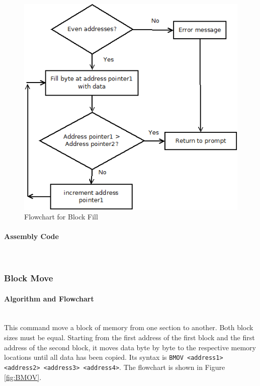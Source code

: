 \documentclass[12pt]{article}
\begin{document}
			
\begin{figure}[H]
\centering
\includegraphics[width=0.7\linewidth]{BF}
\caption{Flowchart for Block Fill}
\label{fig:BF}
\end{figure}
			\paragraph{Assembly Code}~\\
			
			
			\subsubsection{Block Move}
			
			
			
			\paragraph{Algorithm and Flowchart}~\\
			This command move a block of memory from one section to another. Both block sizes must be equal. Starting from the first address of the first block and the first address of the second block, it moves data byte by byte to the respective memory locations until all data has been copied. Its syntax is \texttt{BMOV <address1> <address2> <address3> <address4>}. The flowchart is shown in Figure \ref{fig:BMOV}.
			
\end{document}
